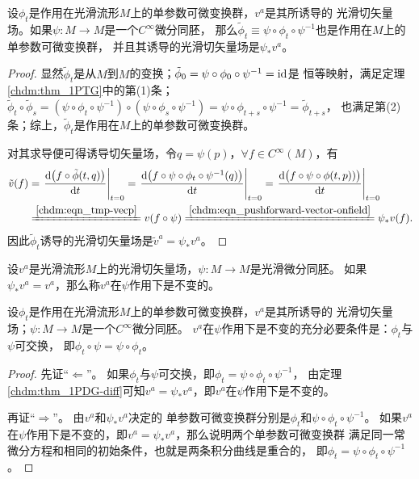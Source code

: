 \begin{theorem}\label{chdm:thm_1PDG-diff}
    设$\phi_t$是作用在光滑流形$M$上的单参数可微变换群，$v^a$是其所诱导的
    光滑切矢量场。如果$\psi:M\to M$是一个$C^\infty$微分同胚，
    那么$\tilde{\phi}_t \equiv \psi \circ \phi_t \circ \psi^{-1}$也是作用在$M$上的单参数可微变换群，
    并且其诱导的光滑切矢量场是$\psi_{*}v^a$。
\end{theorem}
\begin{proof}
    显然$\tilde{\phi}_t$是从$M$到$M$的变换；$\tilde{\phi}_0=\psi \circ \phi_0 \circ \psi^{-1}={\rm id}$是
    恒等映射，满足定理\ref{chdm:thm_1PTG}中的第(1)条；
    $\tilde{\phi}_t\circ \tilde{\phi}_s =  (\psi \circ \phi_t \circ \psi^{-1} ) \circ 
    (\psi \circ \phi_s \circ \psi^{-1}) = \psi \circ \phi_{t+s} \circ \psi^{-1}=\tilde{\phi}_{t+s}$，
    也满足第(2)条；综上，$\tilde{\phi}_t$是作用在$M$上的单参数可微变换群。
    
    对其求导便可得诱导切矢量场，令$q=\psi(p)$，$\forall f\in C^\infty (M)$，有
    \begin{align*}
        \tilde{v}(f) & = \left. \frac{{\rm d} \bigl(f \circ \tilde{\phi}(t,q)\bigr)}{{\rm d} t} \right |_{t=0}
        =\left. \frac{{\rm d} \bigl(f \circ \psi \circ \phi_t \circ \psi^{-1} (q)\bigr)}{{\rm d} t} \right |_{t=0}
        =\left. \frac{{\rm d} \bigl(f \circ \psi \circ \phi(t,p))\bigr)}{{\rm d} t} \right |_{t=0} \\
        &\xlongequal{\ref{chdm:eqn_tmp-vecp}} v(f \circ \psi)
        \xlongequal{\ref{chdm:eqn_pushforward-vector-onfield}} \psi_{*}v(f) .
    \end{align*}
    因此$\tilde{\phi}_t$诱导的光滑切矢量场是$\tilde{v}^a=\psi_{*}v^a$。
\end{proof}

\begin{definition}\label{chdm:def_invariant-vector-field}
    设$v^a$是光滑流形$M$上的光滑切矢量场，$\psi:M\to M$是光滑微分同胚。
    如果$\psi_{*}v^a=v^a$，那么称$v^a$在$\psi$作用下是不变的。
\end{definition}


\begin{proposition}\label{chdm:thm_ivf}
    设$\phi_t$是作用在光滑流形$M$上的单参数可微变换群，$v^a$是其所诱导的
    光滑切矢量场；$\psi:M\to M$是一个$C^\infty$微分同胚。
    $v^a$在$\psi$作用下是不变的充分必要条件是：$\phi_t$与$\psi$可交换，
    即$\phi_t\circ \psi = \psi \circ \phi_t$。
\end{proposition}
\begin{proof}
    先证“$\Leftarrow$”。
    如果$\phi_t$与$\psi$可交换，即${\phi}_t = \psi \circ \phi_t \circ \psi^{-1}$，
    由定理\ref{chdm:thm_1PDG-diff}可知${v}^a=\psi_{*}v^a$，即$v^a$在$\psi$作用下是不变的。
    
    再证“$\Rightarrow$”。
    由${v}^a$和$\psi_{*}v^a$决定的
    单参数可微变换群分别是${\phi}_t$和$\psi \circ \phi_t \circ \psi^{-1}$。
    如果$v^a$在$\psi$作用下是不变的，即${v}^a=\psi_{*}v^a$，那么说明两个单参数可微变换群
    满足同一常微分方程和相同的初始条件，也就是两条积分曲线是重合的，
    即${\phi}_t = \psi \circ \phi_t \circ \psi^{-1}$。
\end{proof}


